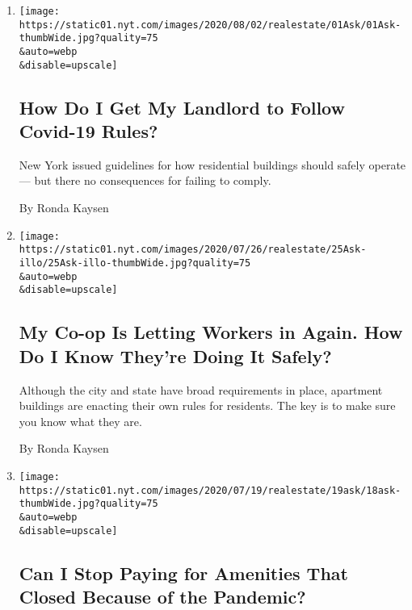 \begin{enumerate}
\def\labelenumi{\arabic{enumi}.}
\item
  \href{/2020/08/01/realestate/coronavirus-covid-apartment-buildings.html}{}

  \texttt{[image: https://static01.nyt.com/images/2020/08/02/realestate/01Ask/01Ask-thumbWide.jpg?quality=75\\\&auto=webp\\\&disable=upscale]}

  \hypertarget{how-do-i-get-my-landlord-to-follow-covid-19-rules}{%
  \subsection{How Do I Get My Landlord to Follow Covid-19
  Rules?}\label{how-do-i-get-my-landlord-to-follow-covid-19-rules}}

  New York issued guidelines for how residential buildings should safely
  operate --- but there no consequences for failing to comply.

  By Ronda Kaysen
\item
  \href{/2020/07/25/realestate/coronavirus-reopening-workers-in-buildings-rules.html}{}

  \texttt{[image: https://static01.nyt.com/images/2020/07/26/realestate/25Ask-illo/25Ask-illo-thumbWide.jpg?quality=75\\\&auto=webp\\\&disable=upscale]}

  \hypertarget{my-co-op-is-letting-workers-in-again-how-do-i-know-theyre-doing-it-safely}{%
  \subsection{My Co-op Is Letting Workers in Again. How Do I Know
  They're Doing It
  Safely?}\label{my-co-op-is-letting-workers-in-again-how-do-i-know-theyre-doing-it-safely}}

  Although the city and state have broad requirements in place,
  apartment buildings are enacting their own rules for residents. The
  key is to make sure you know what they are.

  By Ronda Kaysen
\item
  \href{/2020/07/18/realestate/gym-playroom-fees-coronavirus.html}{}

  \texttt{[image: https://static01.nyt.com/images/2020/07/19/realestate/19ask/18ask-thumbWide.jpg?quality=75\\\&auto=webp\\\&disable=upscale]}

  \hypertarget{can-i-stop-paying-for-amenities-that-closed-because-of-the-pandemic}{%
  \subsection{Can I Stop Paying for Amenities That Closed Because of the
  Pandemic?}\label{can-i-stop-paying-for-amenities-that-closed-because-of-the-pandemic}}


\end{enumerate}
